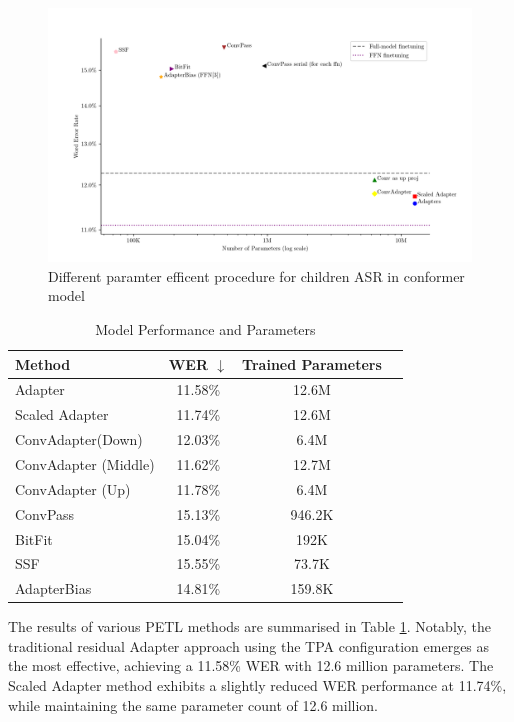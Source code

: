 \begin{figure}
    \begin{center}
        \includegraphics[width=\textwidth]{imgs/Adapter_compare_withoutWide.png}
        \caption{Different paramter efficent procedure for children ASR in conformer model}
        \label{fig:adapter_compared_withoutWide}
    \end{center}
\end{figure}
\begin{table}
    \centering
    \begin{tabular}{lccc}
        \toprule
        \textbf{Method} & \textbf{WER $\downarrow$} & \textbf{Trained Parameters} \\
        \midrule
        Adapter & 11.58\% & 12.6M \\
        Scaled Adapter & 11.74\% & 12.6M \\
        ConvAdapter(Down) & 12.03\% & 6.4M \\
        ConvAdapter (Middle) & 11.62\% & 12.7M \\
        ConvAdapter (Up) & 11.78\% & 6.4M \\
        ConvPass & 15.13\% & 946.2K \\
        BitFit & 15.04\% & 192K \\
        SSF & 15.55\% & 73.7K \\
        AdapterBias & 14.81\% & 159.8K \\
        \bottomrule
    \end{tabular}
    \caption{Model Performance and Parameters}
    \label{tab:PETL_alternatives}
\end{table}
The results of various PETL methods are summarised in Table \ref{tab:PETL_alternatives}. Notably, the traditional residual Adapter approach using the TPA configuration emerges as the most effective, achieving a 11.58\% WER with 12.6 million parameters. The Scaled Adapter method exhibits a slightly reduced WER performance at 11.74\%, while maintaining the same parameter count of 12.6 million.


